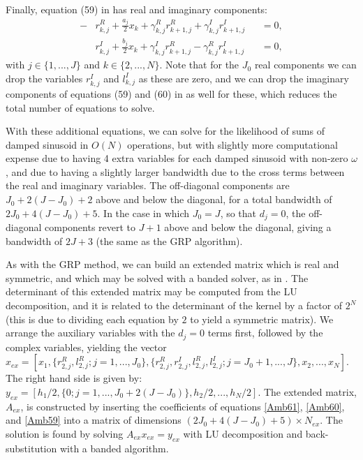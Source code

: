\documentclass[manuscript, letterpaper]{aastex6}
\begin{document}
Finally, equation (59) in \citet{Ambikasaran:2015} has real and imaginary components:
\begin{align} \label{Amb59}
-&r_{k,j}^R + \frac{a_j}{2} x_k + \gamma_{k,j}^R r_{k+1,j}^R + \gamma_{k,j}^I r_{k+1,j}^I &&=0,\\
 &r_{k,j}^I + \frac{b_j}{2} x_k + \gamma_{k,j}^I r_{k+1,j}^R - \gamma_{k,j}^R r_{k+1,j}^I &&=0,
\end{align}
with $j \in \{1,...,J\}$ and $k \in \{2,...,N\}$.  Note that for the $J_0$ real components
we can drop the variables $r_{k,j}^I$ and $l_{k,j}^I$ as these are zero, and we can drop the
imaginary components of equations (59) and (60) in \citet{Ambikasaran:2015} as well for these, which reduces the total number
of equations to solve.

With these additional equations, we can solve for the likelihood of sums of damped sinusoid
in $O(N)$ operations, but with slightly more computational expense due to having 4 extra variables
for each damped sinusoid with non-zero $\omega$, and due to having a slightly larger bandwidth due to the
cross terms between the real and imaginary variables.  The off-diagonal components are $J_0+2(J-J_0)+2$ above
and below the diagonal, for a total bandwidth of $2J_0+4(J-J_0)+5$. In the case in which $J_0=J$, so
that $d_j=0$, the off-diagonal components revert to $J+1$
above and below the diagonal, giving a bandwidth of $2J+3$ (the same as the GRP algorithm).

As with the GRP method, we can build an extended matrix which is real and symmetric, and which may be
solved with a banded solver, as in \citet{NumericalRecipes}.  The determinant of this extended matrix
may be computed from the LU decomposition, and it is related to the determinant of the kernel by a
factor of $2^N$ (this is due to dividing each equation by $2$ to yield a symmetric matrix).
We arrange the auxiliary variables with the $d_j=0$
terms first, followed by the complex variables, yielding the vector
$x_{ex} = [x_1, \{r_{2,j}^R,l_{2,j}^R;j=1,...,J_0\}, \{r_{2,j}^R,r_{2,j}^I,l_{2,j}^R,l_{2,j}^I;j=J_0+1,...,J\},
x_2, ..., x_N]$.  The right hand side is given by: $y_{ex} = [h_1/2, \{0; j=1,...,J_0+2(J-J_0)\}, h_2/2, ..., h_N/2]$.
The extended matrix, $A_{ex}$, is constructed by inserting the coefficients of equations \ref{Amb61},
\ref{Amb60}, and \ref{Amb59} into a matrix of dimensions $(2J_0+4(J-J_0)+5) \times N_{ex}$.
The solution is found by solving $A_{ex} x_{ex} = y_{ex}$ with LU decomposition and back-substitution
with a banded algorithm.
\end{document}
